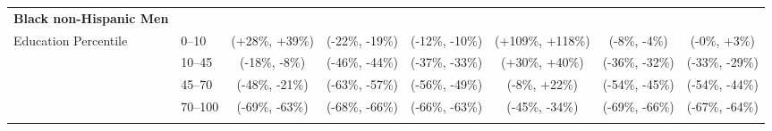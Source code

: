 {\begin{tabular}{llcccccc}
  \hline
  \textbf{Black non-Hispanic Men} & & & & & & & \\
  Education Percentile &  0--10  & (+28\%, +39\%) & (-22\%, -19\%) & (-12\%, -10\%) & (+109\%, +118\%) & (-8\%, -4\%) & (-0\%, +3\%) \\
                       & 10--45  & (-18\%, -8\%) & (-46\%, -44\%) & (-37\%, -33\%) & (+30\%, +40\%) & (-36\%, -32\%) & (-33\%, -29\%) \\
                       & 45--70  & (-48\%, -21\%) & (-63\%, -57\%) & (-56\%, -49\%) & (-8\%, +22\%) & (-54\%, -45\%) & (-54\%, -44\%) \\
                       & 70--100 & (-69\%, -63\%) & (-68\%, -66\%) & (-66\%, -63\%) & (-45\%, -34\%) & (-69\%, -66\%) & (-67\%, -64\%) \\
\hline & & & & & & & \\
\end{tabular}
}
